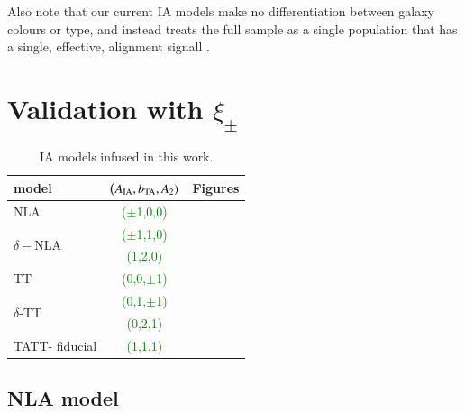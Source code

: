 \documentclass[useAMS,usenatbib]{mn2e}
\begin{document}
Also note that our current IA models make no differentiation between galaxy colours or type, and instead treats the full sample as a single population that has a single, effective, alignment signall \citep[see][for an example with a red/blue split]{DESY1_IA_Samuroff}.


\section{Validation with $\xi_{\pm}$}
\label{sec:validation}




\begin{table}
   \centering
   \begin{tabular}{@{} lcr @{}} %
      \hline
      \hline
      model   		& ($A_{\rm IA}, b_{\rm TA}, A_2)$ & Figures\\
      \hline
      NLA     		& \textcolor{green}{($\pm$1,0,0) }&  \\
      \multirow{2}{*}{$\delta-$NLA }  	&   \textcolor{green}{($\pm$1,1,0)} &  \\
      							&  \textcolor{green}{(1,2,0)} &  \\
      TT 			&  \textcolor{green}{(0,0,$\pm$1)} &  \\
      \multirow{2}{*}{$\delta$-TT} 	&  \textcolor{green}{(0,1,$\pm$1)} &  \\
      				&  \textcolor{green}{(0,2,1)} &  \\
      TATT- fiducial	&  \textcolor{green}{ (1,1,1)} & \\
      \hline
      \hline

   \end{tabular}
   \caption{IA models infused in this work.}
   \label{table:IAmodels}
\end{table}


\subsection{NLA model}
\label{subsubsec:sigma_G}
\end{document}
